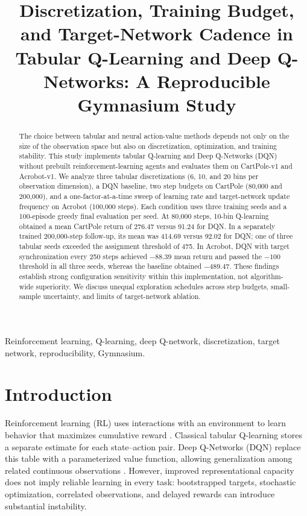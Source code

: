 \documentclass[conference,10pt]{IEEEtran}
\title{Discretization, Training Budget, and Target-Network Cadence in Tabular Q-Learning and Deep Q-Networks: A Reproducible Gymnasium Study}
\author{\IEEEauthorblockN{Cristian Javier Ibadango Avilez}\IEEEauthorblockA{Yachay Tech University, Ecuador\\\texttt{cristian.ibadango@yachaytech.edu.ec}}}
\begin{document}
\maketitle
\begin{abstract}
The choice between tabular and neural action-value methods depends not only on the size of the observation space but also on discretization, optimization, and training stability. This study implements tabular Q-learning and Deep Q-Networks (DQN) without prebuilt reinforcement-learning agents and evaluates them on CartPole-v1 and Acrobot-v1. We analyze three tabular discretizations (6, 10, and 20 bins per observation dimension), a DQN baseline, two step budgets on CartPole (80,000 and 200,000), and a one-factor-at-a-time sweep of learning rate and target-network update frequency on Acrobot (100,000 steps). Each condition uses three training seeds and a 100-episode greedy final evaluation per seed. At 80,000 steps, 10-bin Q-learning obtained a mean CartPole return of 276.47 versus 91.24 for DQN. In a separately trained 200,000-step follow-up, its mean was 414.69 versus 92.02 for DQN; one of three tabular seeds exceeded the assignment threshold of 475. In Acrobot, DQN with target synchronization every 250 steps achieved $-88.39$ mean return and passed the $-100$ threshold in all three seeds, whereas the baseline obtained $-489.47$. These findings establish strong configuration sensitivity within this implementation, not algorithm-wide superiority. We discuss unequal exploration schedules across step budgets, small-sample uncertainty, and limits of target-network ablation.
\end{abstract}
\begin{IEEEkeywords}
Reinforcement learning, Q-learning, deep Q-network, discretization, target network, reproducibility, Gymnasium.
\end{IEEEkeywords}

\section{Introduction}
Reinforcement learning (RL) uses interactions with an environment to learn behavior that maximizes cumulative reward \cite{Sutton2018}. Classical tabular Q-learning stores a separate estimate for each state--action pair. Deep Q-Networks (DQN) replace this table with a parameterized value function, allowing generalization among related continuous observations \cite{Mnih2015}. However, improved representational capacity does not imply reliable learning in every task: bootstrapped targets, stochastic optimization, correlated observations, and delayed rewards can introduce substantial instability.
\end{document}
